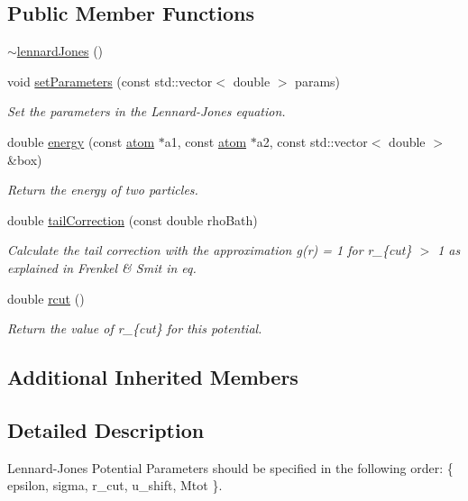 \subsection*{Public Member Functions}
\begin{DoxyCompactItemize}
\item 
\hyperlink{classlennard_jones_aa05d64fac84629b8bfbbc1387a41119b}{$\sim$lennard\-Jones} ()
\item 
void \hyperlink{classlennard_jones_a5b4c41df05048ce99bffb9f27733100a}{set\-Parameters} (const std\-::vector$<$ double $>$ params)
\begin{DoxyCompactList}\small\item\em Set the parameters in the Lennard-\/\-Jones equation. \end{DoxyCompactList}\item 
double \hyperlink{classlennard_jones_a1be571dbb8f547f1bddaf76697fcad19}{energy} (const \hyperlink{classatom}{atom} $\ast$a1, const \hyperlink{classatom}{atom} $\ast$a2, const std\-::vector$<$ double $>$ \&box)
\begin{DoxyCompactList}\small\item\em Return the energy of two particles. \end{DoxyCompactList}\item 
double \hyperlink{classlennard_jones_a4518a7a9970c1fbed2f2abcf0ceebbfc}{tail\-Correction} (const double rho\-Bath)
\begin{DoxyCompactList}\small\item\em Calculate the tail correction with the approximation g(r) = 1 for r\-\_\-\{cut\} $>$ 1 as explained in Frenkel \& Smit in eq. \end{DoxyCompactList}\item 
double \hyperlink{classlennard_jones_a6ab5b04c385544da0de985e9635a6e8c}{rcut} ()
\begin{DoxyCompactList}\small\item\em Return the value of r\-\_\-\{cut\} for this potential. \end{DoxyCompactList}\end{DoxyCompactItemize}
\subsection*{Additional Inherited Members}


\subsection{Detailed Description}
Lennard-\/\-Jones Potential Parameters should be specified in the following order\-: \{ epsilon, sigma, r\-\_\-cut, u\-\_\-shift, Mtot \}. 

